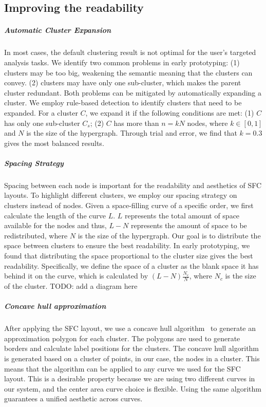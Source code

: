 \subsection{Improving the readability}
\subparagraph{Automatic Cluster Expansion}
In most cases, the default clustering result is not optimal for the user's targeted analysis tasks.
We identify two common problems in early prototyping: 
(1) clusters may be too big, weakening the semantic meaning that the clusters can convey.
(2) clusters may have only one sub-cluster, which makes the parent cluster redundant. 
Both problems can be mitigated by automatically expanding a cluster.
We employ rule-based detection to identify clusters that need to be expanded.
For a cluster $C$, we expand it if the following conditions are met:
(1) $C$ has only one sub-cluster $C_s$;
(2) $C$ has more than $n = k N$ nodes, where $k \in [0, 1]$ and $N$ is the size of the hypergraph.
Through trial and error, we find that $k=0.3$ gives the most balanced results.

\subparagraph{Spacing Strategy}
Spacing between each node is important for the readability and aesthetics of SFC layouts.
To highlight different clusters, we employ our spacing strategy on clusters instead of nodes.
Given a space-filling curve of a specific order, we first calculate the length of the curve $L$.
$L$ represents the total amount of space available for the nodes and thus,
$L - N$ represents the amount of space to be redistributed, where $N$ is the size of the hypergraph.
Our goal is to distribute the space between clusters to ensure the best readability.
In early prototyping, we found that distributing the space proportional to the cluster size gives the best readability.
Specifically, we define the space of a cluster as the blank space it has behind it on the curve, which is calculated by $(L-N)\frac{N_c}{N}$, where $N_c$ is the size of the cluster.
TODO: add a diagram here

\subparagraph{Concave hull approximation}
After applying the SFC layout, we use a concave hull algorithm~\cite{park2012concavehull} to generate an approximation polygon for each cluster.
The polygons are used to generate borders and calculate label positions for the clusters.
The concave hull algorithm is generated based on a cluster of points, in our case, the nodes in a cluster.
This means that the algorithm can be applied to any curve we used for the SFC layout.
This is a desirable property because we are using two different curves in our system, and the center area curve choice is flexible.
Using the same algorithm guarantees a unified aesthetic across curves.

